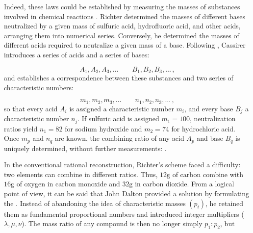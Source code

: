 \documentclass[submitted,12pt]{article}
\begin{document}
Indeed, these laws could be established by measuring the masses of substances involved in chemical reactions  . Richter determined the masses of different bases neutralized by a given mass of sulfuric acid, hydrofluoric acid, and other acids, arranging them into numerical series. Conversely, he determined the masses of different acids required to neutralize a given mass of a base. Following \citet[71]{Duhem1902}, Cassirer introduces a series of acids and a series of bases:

\begin{equation*}
A_1, A_2, A_3, \ldots \qquad B_1, B_2, B_3, \ldots\,,
\end{equation*}
%
and establishes a correspondence between these substances and two series of characteristic numbers:

\begin{equation*}
m_1, m_2, m_3, \ldots \qquad n_1, n_2, n_3, \ldots\,,
\end{equation*}
%
so that every acid $A_i$ is assigned a characteristic number $m_i$, and every base $B_j$ a characteristic number $n_j$. If sulfuric acid is assigned $m_1=100$, neutralization ratios yield $n_1=82$ for sodium hydroxide and $m_2=74$ for hydrochloric acid. Once $m_p$ and $n_q$ are known, the combining ratio of any acid $A_p$ and base $B_q$ is uniquely determined, without further measurements:  .

In the conventional rational reconstruction, Richter's scheme faced a difficulty: two elements can combine in different ratios. Thus, $12\text{g}$ of carbon combine with $16\text{g}$ of oxygen in carbon monoxide and $32\text{g}$ in carbon dioxide. From a logical point of view, it can be said that John Dalton provided a solution by formulating the . Instead of abandoning the idea of characteristic masses $\left(p_i\right)$, he retained them as fundamental proportional numbers and introduced integer multipliers ($\lambda, \mu, \nu$). The mass ratio of any compound is then no longer simply $p_1: p_2$, but
\end{document}
